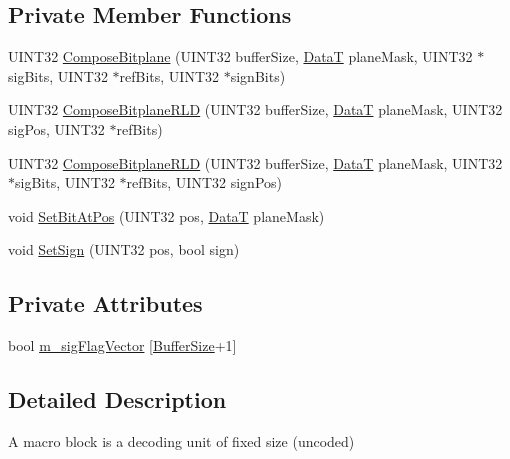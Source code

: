 \subsection*{Private Member Functions}
\begin{DoxyCompactItemize}
\item 
U\+I\+N\+T32 \mbox{\hyperlink{classCDecoder_1_1CMacroBlock_a580e46028e0104de8d6afab733c8b679}{Compose\+Bitplane}} (U\+I\+N\+T32 buffer\+Size, \mbox{\hyperlink{PGFtypes_8h_acb1ee3f52ccfad782dcaa0abd79e5d05}{DataT}} plane\+Mask, U\+I\+N\+T32 $\ast$sig\+Bits, U\+I\+N\+T32 $\ast$ref\+Bits, U\+I\+N\+T32 $\ast$sign\+Bits)
\item 
U\+I\+N\+T32 \mbox{\hyperlink{classCDecoder_1_1CMacroBlock_aa6e8f0dedcdeb9e592de7dde07b5025e}{Compose\+Bitplane\+R\+LD}} (U\+I\+N\+T32 buffer\+Size, \mbox{\hyperlink{PGFtypes_8h_acb1ee3f52ccfad782dcaa0abd79e5d05}{DataT}} plane\+Mask, U\+I\+N\+T32 sig\+Pos, U\+I\+N\+T32 $\ast$ref\+Bits)
\item 
U\+I\+N\+T32 \mbox{\hyperlink{classCDecoder_1_1CMacroBlock_af7de96f745479ca3956f671a7f794489}{Compose\+Bitplane\+R\+LD}} (U\+I\+N\+T32 buffer\+Size, \mbox{\hyperlink{PGFtypes_8h_acb1ee3f52ccfad782dcaa0abd79e5d05}{DataT}} plane\+Mask, U\+I\+N\+T32 $\ast$sig\+Bits, U\+I\+N\+T32 $\ast$ref\+Bits, U\+I\+N\+T32 sign\+Pos)
\item 
void \mbox{\hyperlink{classCDecoder_1_1CMacroBlock_a4bf1b6bc026f95ef4d93fbdfaf69f724}{Set\+Bit\+At\+Pos}} (U\+I\+N\+T32 pos, \mbox{\hyperlink{PGFtypes_8h_acb1ee3f52ccfad782dcaa0abd79e5d05}{DataT}} plane\+Mask)
\item 
void \mbox{\hyperlink{classCDecoder_1_1CMacroBlock_a7fd4539d524903d148ceb4de940d3194}{Set\+Sign}} (U\+I\+N\+T32 pos, bool sign)
\end{DoxyCompactItemize}
\subsection*{Private Attributes}
\begin{DoxyCompactItemize}
\item 
bool \mbox{\hyperlink{classCDecoder_1_1CMacroBlock_af6931769654b397d6c3becae44e868b0}{m\+\_\+sig\+Flag\+Vector}} \mbox{[}\mbox{\hyperlink{PGFtypes_8h_aa362edf6db9662acf6ef958a6db19c35}{Buffer\+Size}}+1\mbox{]}
\end{DoxyCompactItemize}


\subsection{Detailed Description}
A macro block is a decoding unit of fixed size (uncoded) 

